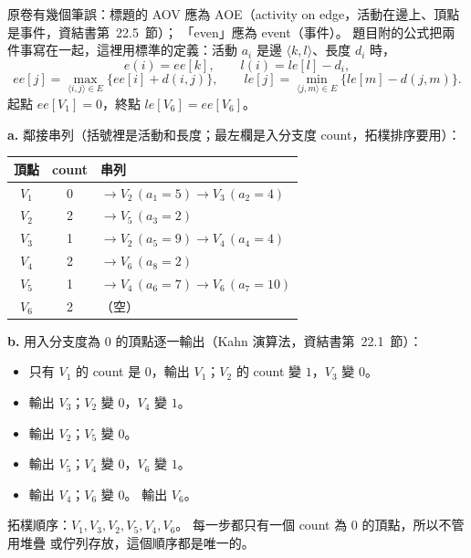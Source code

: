 \begin{pastsoln}
原卷有幾個筆誤：標題的 AOV 應為 AOE（activity on edge，活動在邊上、頂點是事件，資結書第~22.5~節）；
「even」應為 event（事件）。 題目附的公式把兩件事寫在一起，這裡用標準的定義：活動 $a_i$ 是邊
$\langle k, l\rangle$、長度 $d_i$ 時，
\[
e(i) = ee[k], \qquad l(i) = le[l] - d_i ,
\]
\[
ee[j] = \max_{\langle i, j\rangle \in E} \{ ee[i] + d(i, j) \}, \qquad
le[j] = \min_{\langle j, m\rangle \in E} \{ le[m] - d(j, m) \} .
\]
起點 $ee[V_1] = 0$，終點 $le[V_6] = ee[V_6]$。

\textbf{a.} 鄰接串列（括號裡是活動和長度；最左欄是入分支度 count，拓樸排序要用）：
\begin{center}
\begin{tabular}{ccl}
\toprule
頂點 & count & 串列 \\
\midrule
$V_1$ & 0 & $\to V_2\,(a_1 = 5) \to V_3\,(a_2 = 4)$ \\
$V_2$ & 2 & $\to V_5\,(a_3 = 2)$ \\
$V_3$ & 1 & $\to V_2\,(a_5 = 9) \to V_4\,(a_4 = 4)$ \\
$V_4$ & 2 & $\to V_6\,(a_8 = 2)$ \\
$V_5$ & 1 & $\to V_4\,(a_6 = 7) \to V_6\,(a_7 = 10)$ \\
$V_6$ & 2 & （空） \\
\bottomrule
\end{tabular}
\end{center}

\textbf{b.} 用入分支度為 $0$ 的頂點逐一輸出（Kahn 演算法，資結書第~22.1~節）：
\begin{itemize}
\item 只有 $V_1$ 的 count 是 $0$，輸出 $V_1$；$V_2$ 的 count 變 $1$，$V_3$ 變 $0$。
\item 輸出 $V_3$；$V_2$ 變 $0$，$V_4$ 變 $1$。
\item 輸出 $V_2$；$V_5$ 變 $0$。
\item 輸出 $V_5$；$V_4$ 變 $0$，$V_6$ 變 $1$。
\item 輸出 $V_4$；$V_6$ 變 $0$。 輸出 $V_6$。
\end{itemize}
拓樸順序：$V_1, V_3, V_2, V_5, V_4, V_6$。 每一步都只有一個 count 為 $0$ 的頂點，所以不管用堆疊
或佇列存放，這個順序都是唯一的。


\end{pastsoln}
